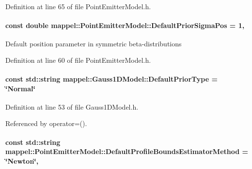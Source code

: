 Definition at line 65 of file Point\+Emitter\+Model.\+h.

\paragraph[{\texorpdfstring{Default\+Prior\+Sigma\+Pos}{DefaultPriorSigmaPos}}]{\setlength{\rightskip}{0pt plus 5cm}const double mappel\+::\+Point\+Emitter\+Model\+::\+Default\+Prior\+Sigma\+Pos = 1\hspace{0.3cm}{\ttfamily [static]}, {\ttfamily [inherited]}}\hypertarget{classmappel_1_1PointEmitterModel_a38b73a91eaae7b5fd0977b88ea844280}{}\label{classmappel_1_1PointEmitterModel_a38b73a91eaae7b5fd0977b88ea844280}
Default position parameter in symmetric beta-\/distributions 

Definition at line 60 of file Point\+Emitter\+Model.\+h.

\paragraph[{\texorpdfstring{Default\+Prior\+Type}{DefaultPriorType}}]{\setlength{\rightskip}{0pt plus 5cm}const std\+::string mappel\+::\+Gauss1\+D\+Model\+::\+Default\+Prior\+Type = \char`\"{}Normal\char`\"{}\hspace{0.3cm}{\ttfamily [static]}}\hypertarget{classmappel_1_1Gauss1DModel_a4186ce131a5cc9a451ecc0011e4e6682}{}\label{classmappel_1_1Gauss1DModel_a4186ce131a5cc9a451ecc0011e4e6682}


Definition at line 53 of file Gauss1\+D\+Model.\+h.



Referenced by operator=().

\paragraph[{\texorpdfstring{Default\+Profile\+Bounds\+Estimator\+Method}{DefaultProfileBoundsEstimatorMethod}}]{\setlength{\rightskip}{0pt plus 5cm}const std\+::string mappel\+::\+Point\+Emitter\+Model\+::\+Default\+Profile\+Bounds\+Estimator\+Method = \char`\"{}Newton\char`\"{}\hspace{0.3cm}{\ttfamily [static]}, {\ttfamily [inherited]}}\hypertarget{classmappel_1_1PointEmitterModel_a5240568f2d7c7bad84e900d283b299dc}{}\label{classmappel_1_1PointEmitterModel_a5240568f2d7c7bad84e900d283b299dc}


